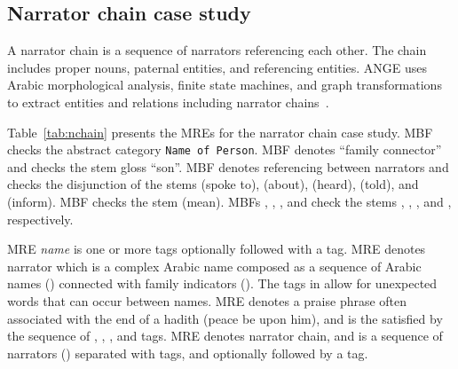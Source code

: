 \subsection{Narrator chain case study}
A narrator chain is a sequence of narrators referencing each other. 
The chain includes proper nouns, paternal entities, and referencing entities. 
ANGE uses Arabic morphological analysis, finite state machines, and graph transformations 
to extract entities and relations including narrator chains~\cite{ZaMaFlairs2012HadithBio}.

\transfalse
Table~\ref{tab:nchain} presents the MREs for the narrator chain case study. 
MBF  checks the abstract category {\tt Name of Person}. 
MBF  denotes ``family connector'' and checks the stem gloss ``son''. 
MBF  denotes referencing between narrators and checks the disjunction of 
the stems (spoke to), (about), (heard), (told), and (inform). 
MBF  checks the stem (mean). 
MBFs , , , and  check the 
stems , , , and , respectively. 
\transtrue

MRE {\em name} is one or more  tags optionally followed 
with a  tag. 
MRE  denotes narrator which is a complex Arabic name
composed as a sequence of Arabic names () 
connected with family indicators (). 
The  tags in  allow for unexpected words 
that can occur between names. 
MRE  denotes a praise phrase often associated with 
the end of a hadith (peace be upon him), 
and is the satisfied by the sequence of
, , , and  tags. 
MRE  denotes narrator chain, 
and is a sequence of narrators ()
separated with  tags, and optionally followed
by a  tag. 


